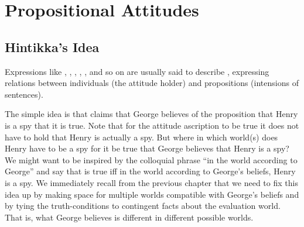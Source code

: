 \chapter{Propositional Attitudes}\label{cha:propositional_attitudes} %


\minitoc

\section{Hintikka's Idea} \label{sec:hintikkas-idea}

Expressions %
%
like , , ,
, , and so on are usually said
to describe , expressing relations
between individuals (the attitude holder) and propositions (intensions
of sentences).

The simple idea is that  claims that George believes of the proposition that Henry is a
spy that it is true. %
%
Note that for the attitude ascription to be true it does not have to
hold that Henry is actually a spy. But where \dash in which world(s)
\dash does Henry have to be a spy for it be true that George believes
that Henry is a spy? We might want to be inspired by the colloquial
phrase ``in the world according to George'' and say that
 is true iff in the
world according to George's beliefs, Henry is a spy. We immediately
recall from the previous chapter that we need to fix this idea up by
making space for multiple worlds compatible with George's beliefs and
by tying the truth-conditions to contingent facts about the evaluation
world. That is, what George believes is different in different
possible worlds.

